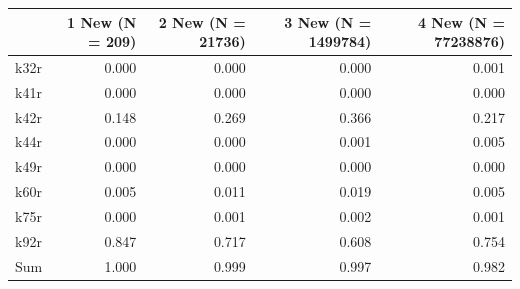 \begin{tabular}{lrrrr}
\toprule
 & 1 New (N = 209) & 2 New (N = 21736) & 3 New (N = 1499784) & 4 New (N = 77238876) \\
\midrule
k32r & 0.000 & 0.000 & 0.000 & 0.001 \\
k41r & 0.000 & 0.000 & 0.000 & 0.000 \\
k42r & 0.148 & 0.269 & 0.366 & 0.217 \\
k44r & 0.000 & 0.000 & 0.001 & 0.005 \\
k49r & 0.000 & 0.000 & 0.000 & 0.000 \\
k60r & 0.005 & 0.011 & 0.019 & 0.005 \\
k75r & 0.000 & 0.001 & 0.002 & 0.001 \\
k92r & 0.847 & 0.717 & 0.608 & 0.754 \\
Sum & 1.000 & 0.999 & 0.997 & 0.982 \\
\bottomrule
\end{tabular}
